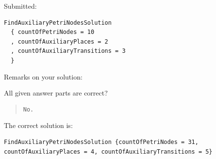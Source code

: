 Submitted:


\begin{verbatim}
FindAuxiliaryPetriNodesSolution 
  { countOfPetriNodes = 10
  , countOfAuxiliaryPlaces = 2
  , countOfAuxiliaryTransitions = 3 
  }
\end{verbatim}


Remarks on your solution:

All given answer parts are correct?

\begin{quote}
\begin{verbatim}
No.
\end{verbatim}
\end{quote}

The correct solution is:
\begin{verbatim}
FindAuxiliaryPetriNodesSolution {countOfPetriNodes = 31, countOfAuxiliaryPlaces = 4, countOfAuxiliaryTransitions = 5}
\end{verbatim}


